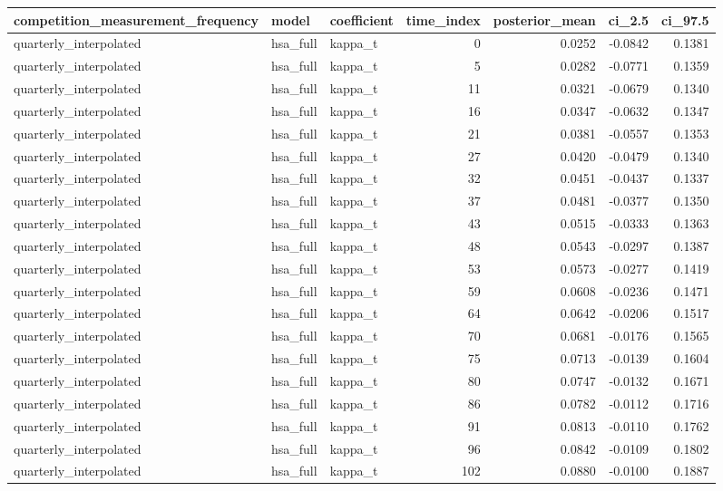 \begin{tabular}{lllrrrr}
\toprule
competition\_measurement\_frequency & model & coefficient & time\_index & posterior\_mean & ci\_2.5 & ci\_97.5 \\
\midrule
quarterly\_interpolated & hsa\_full & kappa\_t & 0 & 0.0252 & -0.0842 & 0.1381 \\
quarterly\_interpolated & hsa\_full & kappa\_t & 5 & 0.0282 & -0.0771 & 0.1359 \\
quarterly\_interpolated & hsa\_full & kappa\_t & 11 & 0.0321 & -0.0679 & 0.1340 \\
quarterly\_interpolated & hsa\_full & kappa\_t & 16 & 0.0347 & -0.0632 & 0.1347 \\
quarterly\_interpolated & hsa\_full & kappa\_t & 21 & 0.0381 & -0.0557 & 0.1353 \\
quarterly\_interpolated & hsa\_full & kappa\_t & 27 & 0.0420 & -0.0479 & 0.1340 \\
quarterly\_interpolated & hsa\_full & kappa\_t & 32 & 0.0451 & -0.0437 & 0.1337 \\
quarterly\_interpolated & hsa\_full & kappa\_t & 37 & 0.0481 & -0.0377 & 0.1350 \\
quarterly\_interpolated & hsa\_full & kappa\_t & 43 & 0.0515 & -0.0333 & 0.1363 \\
quarterly\_interpolated & hsa\_full & kappa\_t & 48 & 0.0543 & -0.0297 & 0.1387 \\
quarterly\_interpolated & hsa\_full & kappa\_t & 53 & 0.0573 & -0.0277 & 0.1419 \\
quarterly\_interpolated & hsa\_full & kappa\_t & 59 & 0.0608 & -0.0236 & 0.1471 \\
quarterly\_interpolated & hsa\_full & kappa\_t & 64 & 0.0642 & -0.0206 & 0.1517 \\
quarterly\_interpolated & hsa\_full & kappa\_t & 70 & 0.0681 & -0.0176 & 0.1565 \\
quarterly\_interpolated & hsa\_full & kappa\_t & 75 & 0.0713 & -0.0139 & 0.1604 \\
quarterly\_interpolated & hsa\_full & kappa\_t & 80 & 0.0747 & -0.0132 & 0.1671 \\
quarterly\_interpolated & hsa\_full & kappa\_t & 86 & 0.0782 & -0.0112 & 0.1716 \\
quarterly\_interpolated & hsa\_full & kappa\_t & 91 & 0.0813 & -0.0110 & 0.1762 \\
quarterly\_interpolated & hsa\_full & kappa\_t & 96 & 0.0842 & -0.0109 & 0.1802 \\
quarterly\_interpolated & hsa\_full & kappa\_t & 102 & 0.0880 & -0.0100 & 0.1887 \\

\end{tabular}
